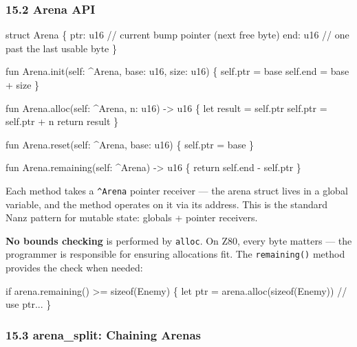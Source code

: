 \documentclass[
  11pt,
]{article}
\newenvironment{Shaded}{\begin{snugshade}}{\end{snugshade}}
\newcommand{\NormalTok}[1]{#1}
\begin{document}
\hypertarget{arena-api}{%
\subsubsection{15.2 Arena API}\label{arena-api}}

\begin{Shaded}
\begin{Highlighting}[]
\NormalTok{struct Arena \{}
\NormalTok{    ptr: u16    // current bump pointer (next free byte)}
\NormalTok{    end: u16    // one past the last usable byte}
\NormalTok{\}}

\NormalTok{fun Arena.init(self: \^{}Arena, base: u16, size: u16) \{}
\NormalTok{    self.ptr = base}
\NormalTok{    self.end = base + size}
\NormalTok{\}}

\NormalTok{fun Arena.alloc(self: \^{}Arena, n: u16) {-}\textgreater{} u16 \{}
\NormalTok{    let result = self.ptr}
\NormalTok{    self.ptr = self.ptr + n}
\NormalTok{    return result}
\NormalTok{\}}

\NormalTok{fun Arena.reset(self: \^{}Arena, base: u16) \{}
\NormalTok{    self.ptr = base}
\NormalTok{\}}

\NormalTok{fun Arena.remaining(self: \^{}Arena) {-}\textgreater{} u16 \{}
\NormalTok{    return self.end {-} self.ptr}
\NormalTok{\}}
\end{Highlighting}
\end{Shaded}

Each method takes a \texttt{\^{}Arena} pointer receiver --- the arena
struct lives in a global variable, and the method operates on it via its
address. This is the standard Nanz pattern for mutable state: globals +
pointer receivers.

\textbf{No bounds checking} is performed by \texttt{alloc}. On Z80,
every byte matters --- the programmer is responsible for ensuring
allocations fit. The \texttt{remaining()} method provides the check when
needed:

\begin{Shaded}
\begin{Highlighting}[]
\NormalTok{if arena.remaining() \textgreater{}= sizeof(Enemy) \{}
\NormalTok{    let ptr = arena.alloc(sizeof(Enemy))}
\NormalTok{    // use ptr...}
\NormalTok{\}}
\end{Highlighting}
\end{Shaded}

\hypertarget{arena_split-chaining-arenas}{%
\subsubsection{15.3 arena\_split: Chaining
Arenas}\label{arena_split-chaining-arenas}}
\end{document}
